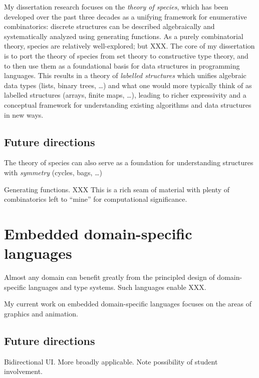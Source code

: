 \documentclass{article}
\begin{document}
My dissertation research focuses on the \emph{theory of species},
which has been developed over the past three decades as a unifying
framework for enumerative combinatorics: discrete structures can be
described algebraically and systematically analyzed using generating
functions.  As a purely combinatorial theory, species are relatively
well-explored; but XXX.  The core of my dissertation is to port the
theory of species from set theory to constructive type theory, and to
then use them as a foundational basis for data structures in
programming languages. This results in a theory of \emph{labelled
  structures} which unifies algebraic data types (lists, binary trees,
\dots) and what one would more typically think of as labelled
structures (arrays, finite maps, \dots), leading to richer
expressivity and a conceptual framework for understanding existing
algorithms and data structures in new ways.

\subsection*{Future directions}

 The
theory of species can also serve as a foundation for understanding
structures with \emph{symmetry} (cycles, bags, \dots)

Generating functions. XXX This is a rich seam of material with plenty
of combinatorics left to ``mine'' for computational significance.

\section*{Embedded domain-specific languages}
\label{sec:edsls}

Almost any domain can benefit greatly from the principled design of
domain-specific languages and type systems.  Such languages enable XXX.

My current work on embedded domain-specific languages focuses on the
areas of graphics and animation.

\subsection*{Future directions}

Bidirectional UI.  More broadly applicable.  Note possibility of
student involvement.
\end{document}
